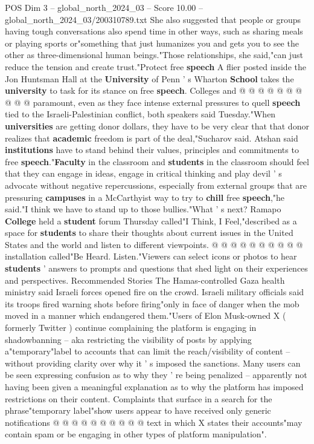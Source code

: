 \begin{textsample}{POS Dim 3 – global\_north\_2024\_03 – Score 10.00 – global\_north\_2024\_03/200310789.txt}
She also suggested that people or groups having tough conversations also spend time in other ways, such as sharing meals or playing sports or"something that just humanizes you and gets you to see the other as three-dimensional human beings."Those relationships, she said,"can just reduce the tension and create trust."Protect free \textbf{speech} A flier posted inside the Jon Huntsman Hall at the \textbf{University} of Penn ' s Wharton \textbf{School} takes the \textbf{university} to task for its stance on free \textbf{speech}.
Colleges and @ @ @ @ @ @ @ @ @ @ paramount, even as they face intense external pressures to quell \textbf{speech} tied to the Israeli-Palestinian conflict, both speakers said Tuesday."When \textbf{universities} are getting donor dollars, they have to be very clear that that donor realizes that \textbf{academic} freedom is part of the deal,"Sucharov said.
Atshan said \textbf{institutions} have to stand behind their values, principles and commitments to free \textbf{speech}."\textbf{Faculty} in the classroom and \textbf{students} in the classroom should feel that they can engage in ideas, engage in critical thinking and play devil ' s advocate without negative repercussions, especially from external groups that are pressuring \textbf{campuses} in a McCarthyist way to try to \textbf{chill} free \textbf{speech},"he said."I think we have to stand up to those bullies."What ' s next?
Ramapo \textbf{College} held a \textbf{student} forum Thursday called"I Think, I Feel,"described as a space for \textbf{students} to share their thoughts about current issues in the United States and the world and listen to different viewpoints. @ @ @ @ @ @ @ @ @ @ installation called"Be Heard.
Listen."Viewers can select icons or photos to hear \textbf{students} ' answers to prompts and questions that shed light on their experiences and perspectives.
Recommended Stories The Hamas-controlled Gaza health ministry said Israeli forces opened fire on the crowd.
Israeli military officials said its troops fired warning shots before firing"only in face of danger when the mob moved in a manner which endangered them."Users of Elon Musk-owned X ( formerly Twitter ) continue complaining the platform is engaging in shadowbanning -- aka restricting the visibility of posts by applying a"temporary"label to accounts that can limit the reach/visibility of content -- without providing clarity over why it ' s imposed the sanctions.
Many users can be seen expressing confusion as to why they ' re being penalized -- apparently not having been given a meaningful explanation as to why the platform has imposed restrictions on their content.
Complaints that surface in a search for the phrase"temporary label"show users appear to have received only generic notifications @ @ @ @ @ @ @ @ @ @ text in which X states their accounts"may contain spam or be engaging in other types of platform manipulation".

\end{textsample}
